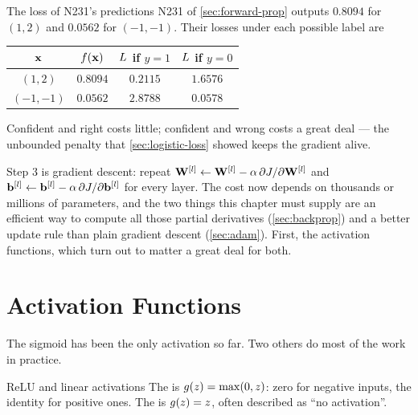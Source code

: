 \begin{workedexample}{The loss of N231's predictions}
N231 of \cref{sec:forward-prop} outputs $0.8094$ for $(1,2)$ and $0.0562$ for
$(-1,-1)$. Their losses under each possible label are

\begin{center}
\small
\renewcommand{\arraystretch}{1.15}
\begin{tabular}{@{}cccc@{}}
\toprule
$\mathbf{x}$ & $f(\mathbf{x})$ & $L$ if $y=1$ & $L$ if $y=0$\\
\midrule
$(1,2)$   & $0.8094$ & $0.2115$ & $1.6576$\\
$(-1,-1)$ & $0.0562$ & $2.8788$ & $0.0578$\\
\bottomrule
\end{tabular}
\end{center}

Confident and right costs little; confident and wrong costs a great deal --- the
unbounded penalty that \cref{sec:logistic-loss} showed keeps the gradient alive.
\end{workedexample}

Step 3 is gradient descent: repeat
$\mathbf{W}^{[l]} \leftarrow \mathbf{W}^{[l]} - \alpha\,\partial J/\partial\mathbf{W}^{[l]}$ and
$\mathbf{b}^{[l]} \leftarrow \mathbf{b}^{[l]} - \alpha\,\partial J/\partial\mathbf{b}^{[l]}$ for every layer.
The cost now depends on thousands or millions of parameters, and the two things
this chapter must supply are an efficient way to compute all those partial
derivatives (\cref{sec:backprop}) and a better update rule than plain gradient
descent (\cref{sec:adam}). First, the activation functions, which turn out to
matter a great deal for both.

\section{Activation Functions}
\label{sec:activations}

The sigmoid has been the only activation so far. Two others do most of the work
in practice.

\begin{defbox}{ReLU and linear activations}
The  is $g(z) = \max(0, z)$: zero for negative
inputs, the identity for positive ones. The  is
$g(z) = z$, often described as ``no activation''.
\end{defbox}

